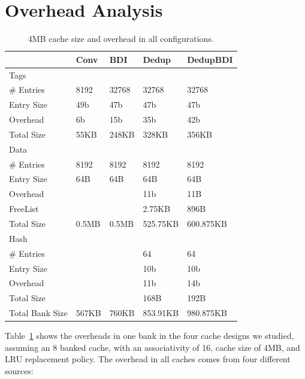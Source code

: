\section{Overhead Analysis}
\label{sec:Overhead}
\begin{table}[]
    \centering
    \begin{tabular}{lllll}
               & Conv   & BDI    & Dedup  & DedupBDI \\ \hline
    Tags       &        &        &        &          \\
    \# Entries & 8192   & 32768   & 32768   & 32768     \\
    Entry Size & 49b    & 47b    & 47b    & 47b      \\
    Overhead   & 6b     & 15b    & 35b    & 42b      \\
    Total Size & 55KB   & 248KB   & 328KB   & 356KB     \\ \hline
    Data       &        &        &        &          \\
    \# Entries & 8192   & 8192   & 8192   & 8192     \\
    Entry Size & 64B    & 64B    & 64B    & 64B      \\
    Overhead   &        &        & 11b    & 11B      \\
    FreeList   &        &        & 2.75KB & 896B     \\
    Total Size & 0.5MB  & 0.5MB  & 525.75KB & 600.875KB   \\ \hline
    Hash       &        &        &        &          \\
    \# Entries &        &        & 64     & 64       \\
    Entry Size &        &        & 10b    & 10b      \\
    Overhead   &        &        & 11b    & 14b      \\
    Total Size &        &        & 168B   & 192B     \\ \hline
    Total Bank Size & 567KB & 760KB & 853.91KB & 980.875KB  
    \end{tabular}
    \caption{4MB cache size and overhead in all configurations.}
    \label{tab:overhead}
\end{table}
Table~\ref{tab:overhead} shows the overheads in one bank in the four cache designs we studied, assuming an 8 banked cache, with an associativity of 16, cache size of 4MB, and LRU replacement policy. The overhead in all caches comes from four different sources:
